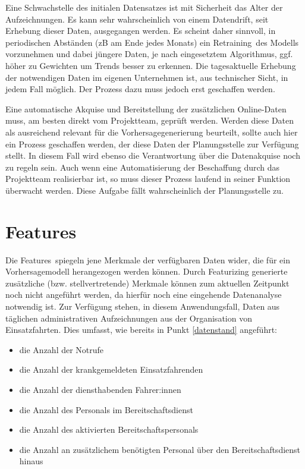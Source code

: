 Eine Schwachstelle des initialen Datensatzes ist mit Sicherheit das Alter der Aufzeichnungen. Es kann sehr wahrscheinlich von einem Datendrift, seit Erhebung dieser Daten, ausgegangen werden. Es scheint daher sinnvoll, in periodischen Abständen (zB am Ende jedes Monats) ein \glqq Retraining\grqq\ des Modells vorzunehmen und dabei jüngere Daten, je nach eingesetztem Algorithmus, ggf. höher zu Gewichten um Trends besser zu erkennen. Die tagesaktuelle Erhebung der notwendigen Daten im eigenen Unternehmen ist, aus technischer Sicht, in jedem Fall möglich. Der Prozess dazu muss jedoch erst geschaffen werden.

Eine automatische Akquise und Bereitstellung der zusätzlichen Online-Daten muss, am besten direkt vom Projektteam, geprüft werden. Werden diese Daten als ausreichend relevant für die Vorhersagegenerierung beurteilt, sollte auch hier ein Prozess geschaffen werden, der diese Daten der Planungsstelle zur Verfügung stellt. In diesem Fall wird ebenso die Verantwortung über die Datenakquise noch zu regeln sein. Auch wenn eine Automatisierung der Beschaffung durch das Projektteam realisierbar ist, so muss dieser Prozess laufend in seiner Funktion überwacht werden. Diese Aufgabe fällt wahrscheinlich der Planungsstelle zu.

\section{Features}
\label{features}
Die \glqq Features\grqq\ spiegeln jene Merkmale der verfügbaren Daten wider, die für ein Vorhersagemodell herangezogen werden können. Durch Featurizing generierte zusätzliche (bzw. stellvertretende) Merkmale können zum aktuellen Zeitpunkt noch nicht angeführt werden, da hierfür noch eine eingehende Datenanalyse notwendig ist. Zur Verfügung stehen, in diesem Anwendungsfall, Daten aus täglichen administrativen Aufzeichnungen aus der Organisation von Einsatzfahrten. Dies umfasst, wie bereits in Punkt \ref{datenstand} angeführt:

\begin{itemize}
 \itemsep-8pt
 \item die Anzahl der Notrufe
 \item die Anzahl der krankgemeldeten Einsatzfahrenden
 \item die Anzahl der diensthabenden Fahrer:innen
 \item die Anzahl des Personals im Bereitschaftsdienst
 \item die Anzahl des aktivierten Bereitschaftspersonals
 \item die Anzahl an zusätzlichem benötigten Personal über den Bereitschaftsdienst hinaus
\end{itemize} 

